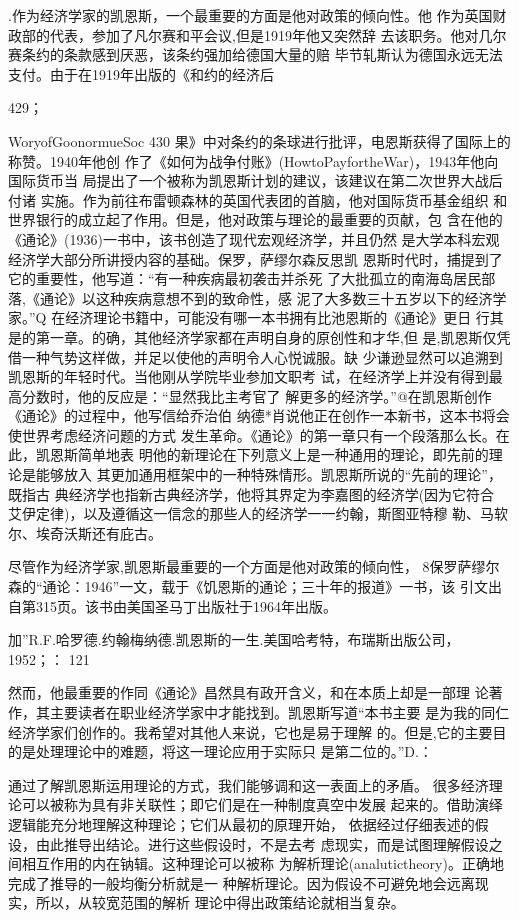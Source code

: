 .作为经济学家的凯恩斯，一个最重要的方面是他对政策的倾向性。他
作为英国财政部的代表，参加了凡尔赛和平会议,但是1919年他又突然辞
去该职务。他对几尔赛条约的条款感到厌恶，该条约强加给德国大量的赔
毕节轧斯认为德国永远无法支付。由于在1919年出版的《和约的经济后




429；




WoryofGoonormueSoc
430
果》中对条约的条球进行批评，电恩斯获得了国际上的称赞。1940年他创
作了《如何为战争付账》(HowtoPayfortheWar)，1943年他向国际货币当
局提出了一个被称为凯恩斯计划的建议，该建议在第二次世界大战后付诸
实施。作为前往布雷顿森林的英国代表团的首脑，他对国际货币基金组织
和世界银行的成立起了作用。但是，他对政策与理论的最重要的页献，包
含在他的《通论》(1936)一书中，该书创造了现代宏观经济学，并且仍然
是大学本科宏观经济学大部分所讲授内容的基础。保罗，萨缪尔森反思凯
恩斯时代时，捕提到了它的重要性，他写道：“有一种疾病最初袭击并杀死
了大批孤立的南海岛居民部落,《通论》以这种疾病意想不到的致命性，感
泥了大多数三十五岁以下的经济学家。”Q
在经济理论书籍中，可能没有哪一本书拥有比池恩斯的《通论》更日
行其是的第一章。的确，其他经济学家都在声明自身的原创性和才华,但
是,凯恩斯仅凭借一种气势这样做，并足以使他的声明令人心悦诚服。缺
少谦逊显然可以追溯到凯恩斯的年轻时代。当他刚从学院毕业参加文职考
试，在经济学上并没有得到最高分数时，他的反应是：“显然我比主考官了
解更多的经济学。”@在凯恩斯创作《通论》的过程中，他写信给乔治伯
纳德*肖说他正在创作一本新书，这本书将会使世界考虑经济问题的方式
发生革命。《通论》的第一章只有一个段落那么长。在此，凯恩斯简单地表
明他的新理论在下列意义上是一种通用的理论，即先前的理论是能够放入
其更加通用框架中的一种特殊情形。凯恩斯所说的“先前的理论”，既指古
典经济学也指新古典经济学，他将其界定为李嘉图的经济学(因为它符合
艾伊定律)，以及遵循这一信念的那些人的经济学一一约翰，斯图亚特穆
勒、马软尔、埃奇沃斯还有庇古。

尽管作为经济学家,凯恩斯最重要的一个方面是他对政策的倾向性，
8保罗萨缪尔森的“通论：1946”一文，载于《饥恩斯的通论；三十年的报道》一书，该
引文出自第315页。该书由美国圣马丁出版社于1964年出版。

加”R.F.哈罗德.约翰梅纳德.凯恩斯的一生.美国哈考特，布瑞斯出版公司，1952；：
121


然而，他最重要的作同《通论》昌然具有政开含义，和在本质上却是一部理
论著作，其主要读者在职业经济学家中才能找到。凯恩斯写道“本书主要
是为我的同仁经济学家们创作的。我希望对其他人来说，它也是易于理解
的。但是,它的主要目的是处理理论中的难题，将这一理论应用于实际只
是第二位的。”D.：

通过了解凯恩斯运用理论的方式，我们能够调和这一表面上的矛盾。
很多经济理论可以被称为具有非关联性；即它们是在一种制度真空中发展
起来的。借助演绎逻辑能充分地理解这种理论；它们从最初的原理开始，
依据经过仔细表述的假设，由此推导出结论。进行这些假设时，不是去考
虑现实，而是试图理解假设之间相互作用的内在钠辑。这种理论可以被称
为解析理论(analutictheory)。正确地完成了推导的一般均衡分析就是一
种解析理论。因为假设不可避免地会远离现实，所以，从较宽范围的解析
理论中得出政策结论就相当复杂。


